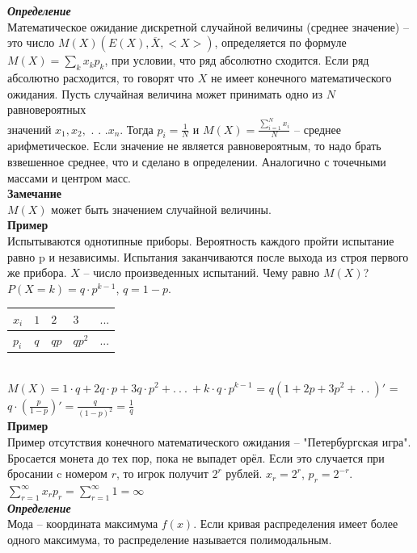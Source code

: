 \documentclass[russian, 12pt, fleqn]{article}
\begin{document}
\textit{\textbf{Определение}}\\
Математическое ожидание дискретной случайной величины (среднее значение) -- это число $M(X)(E(X), \overline{X} , <X>)$, определяется по формуле $M(X)=\sum\limits_{k}x_kp_k$, при условии, что ряд абсолютно сходится. Если ряд абсолютно расходится, то говорят что $X$ не имеет конечного математического ожидания. Пусть случайная величина может принимать одно из $N$ равновероятных \\ значений $x_1,x_2,$ . . .$x_n$. Тогда $p_i = \frac{1}{N}$ и $M(X) = \frac{\sum\limits_{i = 1}^{N}  x_i } { N }$ -- среднее арифметическое. Если значение не является равновероятным, то надо брать взвешенное среднее, что и сделано в определении. Аналогично с точечными массами и центром масс.\\
\textbf{Замечание\ } \\
$M(X)$ может быть значением случайной величины.\\
\textbf{Пример\ }\\
Испытываются однотипные приборы. Вероятность каждого пройти испытание равно p и независимы. Испытания заканчиваются после выхода из строя первого же прибора. $X$ -- число произведенных испытаний. Чему равно $M(X)$?\\
$P(X=k) = q\cdot p ^{k - 1}$, $q = 1 - p$.\\
\begin{tabular}[b]{ | l | l | l | l | l |   }
\hline
$x_i$&$1$&$2$&$3$&$...$\\
\hline
$p_i$&$q$&$qp$&$qp^2$&...\\
\hline
\end{tabular}\\
$M(X) = 1\cdot q + 2q\cdot p + 3 q \cdot p^2 + .\ .\ .\ +k\cdot q\cdot p^{k-1}$ = $q(1+2p+3p^2 + \ .\ .\ )'$ = $q\cdot(\frac{p}{1-p}) ' = \frac{q}{{(1-p)}^2} = \frac{1}{q}$\\
\textbf{Пример\ }\\
 Пример отсутствия конечного математического ожидания -- "Петербургская игра". Бросается монета до тех пор, пока не выпадет орёл. Если это случается при бросании c номером $r$, то игрок получит $2^r$ рублей. $x_r=2^r$, $p_r=2^{-r}$.\\ $\sum\limits_{r = 1}^{\infty}  x_rp_r = \sum\limits_{r = 1}^{\infty} 1 = \infty$\\
\textit{\textbf{Определение}}\\
Мода -- координата максимума $f(x)$. Если кривая распределения имеет более одного максимума, то распределение называется полимодальным.\\
\end{document}
